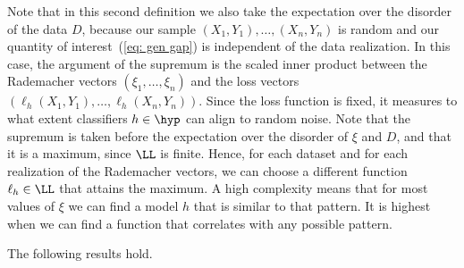 \documentclass[reqno]{amsart}
\begin{document}
Note that in this second definition we also take the expectation over the disorder of the data $D$, because our sample $(X_1,Y_1),\ldots,(X_n,Y_n)$ is random and our quantity of interest~(\ref{eq: gen gap}) is independent of the data realization. 
In this case, the argument of the supremum is the scaled inner product between the Rademacher vectors $(\xi_1,\ldots,\xi_n)$ and the loss vectors $(\ell_h(X_1,Y_1),\ldots,\ell_h(X_n,Y_n))$. Since the loss function is fixed, it measures to what extent classifiers $h\in\hyp$ can align to random noise. Note that the supremum is taken before the expectation over the disorder of $\xi$ and $D$, and that it is a maximum, since $\LL$ is finite. Hence, for each dataset and for each realization of the Rademacher vectors, we can choose a different function $\ell_h \in\LL$ that attains the maximum. A high complexity means that for most values of $\xi$ we can find a model $h$ that is similar to that pattern. It is highest when we can find a function that correlates with any possible pattern.

The following results hold. 
\end{document}
